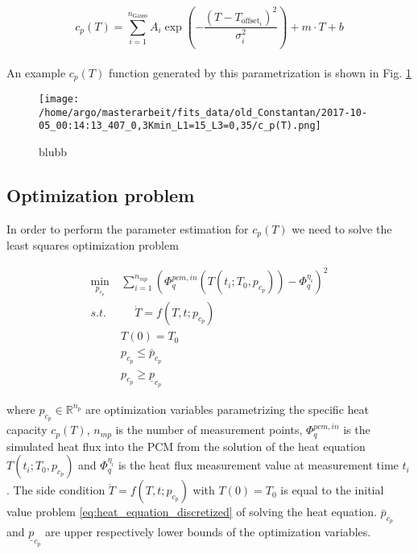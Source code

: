 \documentclass{scrartcl}[12pt, halfparskip]
\begin{document}
\begin{equation}
	c_p(T) = \sum_{i=1}^{n_{\text{Gauss}}} A_i \exp\left(- \frac{(T - T_{\text{offset}_i})^2}{\sigma_i^2}\right) + m \cdot T + b
	\label{eq:parametrization_linear_comb_Gauss}
\end{equation} \\

An example $c_p(T)$ function generated by this parametrization is shown in Fig. \ref{fig:parametrization_example_linear_comb_gauss}


\begin{figure}[H]
	\centering
	\texttt{[image: /home/argo/masterarbeit/fits\_data/old\_Constantan/2017-10-05\_00:14:13\_407\_0,3Kmin\_L1=15\_L3=0,35/c\_p(T).png]}
	\caption{blubb}
	\label{fig:parametrization_example_linear_comb_gauss}
\end{figure}









\subsection{Optimization problem}
In order to perform the parameter estimation for $c_p(T)$ we need to solve the least squares optimization problem

\begin{align}
	\min_{p_{c_p}} \ & \sum_{i=1}^{n_{mp}} \left(  \varPhi_{q}^{pcm,in}(T(t_i;T_0,p_{c_p})) - \varPhi_q^{\eta_i} \right)^2 \\
	s.t. \ & \quad \  \dot{T} = f(T,t;p_{c_p}) \nonumber \\
	& T(0) = T_0 \nonumber \\
	& p_{c_p} \le \bar{p}_{c_p} \nonumber \\
	& p_{c_p} \ge \underline{p}_{c_p} \nonumber
	\label{eq:parameter_estimation_least_squares_problem}
\end{align}

where $p_{c_p} \in \mathbb{R}^{n_p}$ are optimization variables parametrizing the specific heat capacity $c_p(T)$, $n_{{mp}}$ is the number of measurement points, $\varPhi_{q}^{pcm,in}$ is the simulated heat flux into the PCM from the solution of the heat equation $T(t_i;T_0,p_{c_p})$ and $\varPhi_q^{\eta_i}$ is the heat flux measurement value at measurement time $t_i$. The side condition $\dot{T} = f(T,t;p_{c_p})$ with $T(0) = T_0$ is equal to the initial value problem \eqref{eq:heat_equation_discretized} of solving the heat equation. $\bar{p}_{c_p}$ and $\underline{p}_{c_p}$ are upper respectively lower bounds of the optimization variables. \\
\end{document}
